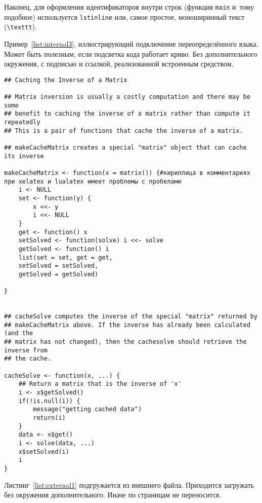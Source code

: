 Наконец, для оформления идентификаторов внутри строк
(функция \lstinline{main} и~тому подобное) используется
\texttt{lstinline} или, самое простое, моноширинный текст
(\texttt{\textbackslash texttt}).


Пример~\ref{list:internal3}, иллюстрирующий подключение переопределённого языка. Может быть полезным, если подсветка кода работает криво. Без дополнительного окружения, с подписью и ссылкой, реализованной встроенным средством.
\begin{lstlisting}[language={Renhanced},caption={Пример листинга c подписью собственными средствами},label={list:internal3}]
## Caching the Inverse of a Matrix

## Matrix inversion is usually a costly computation and there may be some
## benefit to caching the inverse of a matrix rather than compute it repeatedly
## This is a pair of functions that cache the inverse of a matrix.

## makeCacheMatrix creates a special "matrix" object that can cache its inverse

makeCacheMatrix <- function(x = matrix()) {#кириллица в комментариях при xelatex и lualatex имеет проблемы с пробелами
    i <- NULL
    set <- function(y) {
        x <<- y
        i <<- NULL
    }
    get <- function() x
    setSolved <- function(solve) i <<- solve
    getSolved <- function() i
    list(set = set, get = get,
    setSolved = setSolved,
    getSolved = getSolved)
    
}


## cacheSolve computes the inverse of the special "matrix" returned by
## makeCacheMatrix above. If the inverse has already been calculated (and the
## matrix has not changed), then the cachesolve should retrieve the inverse from
## the cache.

cacheSolve <- function(x, ...) {
    ## Return a matrix that is the inverse of 'x'
    i <- x$getSolved()
    if(!is.null(i)) {
        message("getting cached data")
        return(i)
    }
    data <- x$get()
    i <- solve(data, ...)
    x$setSolved(i)
    i  
}
\end{lstlisting} %

Листинг~\ref{list:external1} подгружается из внешнего файла. Приходится загружать без окружения дополнительного. Иначе по страницам не переносится.
    






